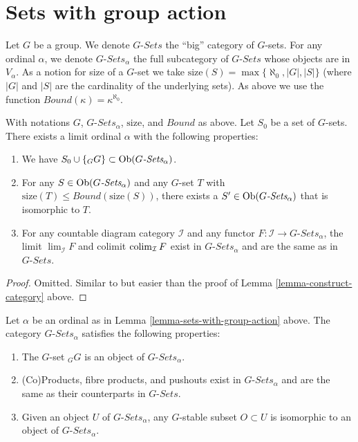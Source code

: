 \section{Sets with group action}
\label{section-sets-with-group-action}

\noindent
Let $G$ be a group. We denote $G\textit{-Sets}$ the ``big'' category
of $G$-sets. For any ordinal $\alpha$, we denote
$G\textit{-Sets}_\alpha$ the full subcategory of $G\textit{-Sets}$
whose objects are in $V_\alpha$. As a notion for size of a $G$-set
we take $\text{size}(S) = \max\{\aleph_0, |G|, |S|\}$ (where $|G|$ and
$|S|$ are the cardinality of the underlying sets). As above we use the function
$Bound(\kappa) = \kappa^{\aleph_0}$.

\begin{lemma}
\label{lemma-sets-with-group-action}
With notations $G$, $G\textit{-Sets}_\alpha$, $\text{size}$,
and $Bound$ as above. Let $S_0$ be a set of $G$-sets.
There exists a limit ordinal $\alpha$ with the following properties:
\begin{enumerate}
\item We have $S_0 \cup \{{}_GG\} \subset \mathop{\rm Ob}\nolimits(G\textit{-Sets}_\alpha)$.
\item For any $S \in \mathop{\rm Ob}\nolimits(G\textit{-Sets}_\alpha)$ and any
$G$-set $T$ with $\text{size}(T) \leq Bound(\text{size}(S))$,
there exists a $S' \in \mathop{\rm Ob}\nolimits(G\textit{-Sets}_\alpha)$
that is isomorphic to $T$.
\item For any countable diagram category $\mathcal{I}$ and
any functor $F : \mathcal{I} \to G\textit{-Sets}_\alpha$, the
limit $\lim_{\mathcal{I}} F$ and colimit
$\mathop{\rm colim}\nolimits_\mathcal{I} F$ exist in $G\textit{-Sets}_\alpha$
and are the same as in $G\textit{-Sets}$.
\end{enumerate}
\end{lemma}

\begin{proof}
Omitted. Similar to but easier than the proof of
Lemma \ref{lemma-construct-category} above.
\end{proof}

\begin{lemma}
\label{lemma-what-is-in-it-G-sets}
Let $\alpha$ be an ordinal as in Lemma \ref{lemma-sets-with-group-action}
above. The category $G\textit{-Sets}_\alpha$ satisfies the following
properties:
\begin{enumerate}
\item The $G$-set ${}_GG$ is an object of $G\textit{-Sets}_\alpha$.
\item (Co)Products, fibre products, and pushouts
exist in $G\textit{-Sets}_\alpha$
and are the same as their counterparts in $G\textit{-Sets}$.
\item Given an object $U$ of $G\textit{-Sets}_\alpha$,
any $G$-stable subset $O \subset U$  is isomorphic to an object
of $G\textit{-Sets}_\alpha$.
\end{enumerate}
\end{lemma}

